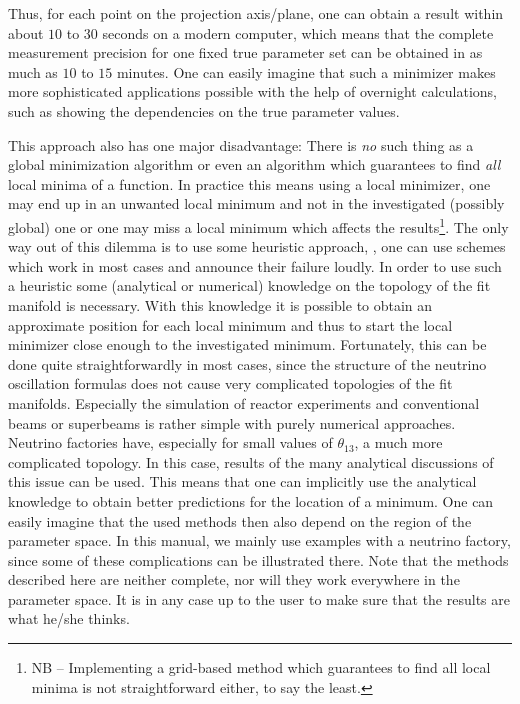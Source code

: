 Thus, for each point on the projection axis/plane, one can obtain a result within about $10$ to $30$ seconds on a modern computer, which means that the complete measurement precision for one fixed true parameter set can be obtained in as much as $10$ to $15$ minutes. One can easily imagine that such a minimizer makes more sophisticated applications possible with the help of overnight calculations, such as showing the dependencies on the true parameter values.

This approach also has one major disadvantage: There is \emph{no} such
thing as a global minimization algorithm or even an algorithm which guarantees
to find \emph{all} local minima of a function. In practice this means using 
 a local minimizer, one may end up in an unwanted local minimum and not in 
the investigated (possibly global) one or 
one may miss a local minimum which affects the results\footnote{NB -- 
Implementing a grid-based method which guarantees to find all local minima is
not straightforward either, to say the least.}. 
The only way out of this dilemma is to use some heuristic approach, \ie , 
one can use schemes which work
in most cases and announce their failure loudly. In order to use such a
heuristic some (analytical or numerical) knowledge on the topology of 
the fit manifold is necessary. With this knowledge it is possible
to obtain an approximate position for each local minimum 
and thus to start the local minimizer 
close enough to the investigated minimum.
 Fortunately, this can be done quite straightforwardly in most cases, since 
the structure of the neutrino oscillation formulas does not cause very 
complicated topologies of the fit manifolds. Especially the simulation of 
reactor experiments and conventional beams or superbeams is rather simple 
with purely numerical
approaches. Neutrino factories have, especially for small values of
$\theta_{13}$, a much more complicated topology. In this case, results
of the many analytical discussions of this issue can be used. This means
 that one can implicitly use the analytical knowledge to obtain 
better predictions for the location of a minimum. One can easily imagine 
that the used methods then also depend
on the region of the parameter space. In this manual, we mainly use
examples with a neutrino factory, since some of these complications
can be illustrated there. Note that the methods described here are neither
complete, nor will they work everywhere in the parameter space. It is
in any case up to the user to make sure that the results are what he/she
thinks.


